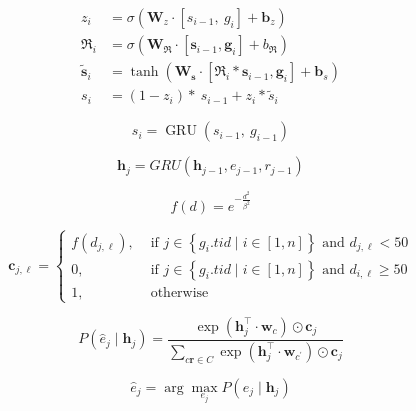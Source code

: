 \begin{equation}\begin{aligned} {z}_{i} &=\sigma\left(\mathbf{W}_{{z}} \cdot\left[{s}_{i-1}, {~g}_{i}\right]+\mathbf{b}_{{z}}\right) \\ \mathfrak{R}_{i} &=\sigma\left(\mathbf{W}_{\mathfrak{R}} \cdot\left[\mathbf{s}_{i-1}, \mathbf{g}_{i}\right]+{b}_{\mathfrak{R}}\right) \\ \tilde{\mathbf{s}}_{i} &=\tanh \left(\mathbf{W}_{\mathbf{s}} \cdot\left[\mathfrak{R}_{i} * \mathbf{s}_{i-1}, \mathbf{g}_{i}\right]+\mathbf{b}_{{s}}\right) \\ s_{i} &=\left(1-{z}_{i}\right) * {~s}_{i-1}+{z}_{i} * \tilde{{s}}_{i} \end{aligned}\end{equation}

\begin{equation} {s}_{i}=\operatorname{GRU}\left({s}_{i-1}, {~g}_{i-1}\right) \end{equation}

\begin{equation} \mathbf{h}_{j}=G R U\left(\mathbf{h}_{j-1}, e_{j-1}, r_{j-1}\right) \end{equation}

\begin{equation} f(d)=e^{-\frac{d^{2}}{\beta^{2}}} \end{equation}

\begin{equation}
\mathbf{c}_{j, \ell}= \begin{cases}f\left(d_{j, \ell}\right), & \text { if } j \in\left\{g_{i} . t i d \mid i \in[1, n]\right\} \text { and } d_{j, \ell}<50 \\ 0, & \text { if } j \in\left\{g_{i} . t i d \mid i \in[1, n]\right\} \text { and } d_{i, \ell} \geq 50 \\ 1, & \text { otherwise }\end{cases}
\end{equation}

\begin{equation}
P\left(\hat{e}_{j} \mid \mathbf{h}_{j}\right)=\frac{\exp \left(\mathbf{h}_{j}^{\top} \cdot \mathbf{w}_{c}\right) \odot \mathbf{c}_{j}}{\sum_{c \boldsymbol{r} \in C} \exp \left(\mathbf{h}_{j}^{\top} \cdot \mathbf{w}_{c^{\prime}}\right) \odot \mathbf{c}_{j}}
\end{equation}

\begin{equation}\hat{e}_j = \arg \max_{e_j} P\left({e}_{j} \mid \mathbf{h}_{j}\right)\end{equation}


